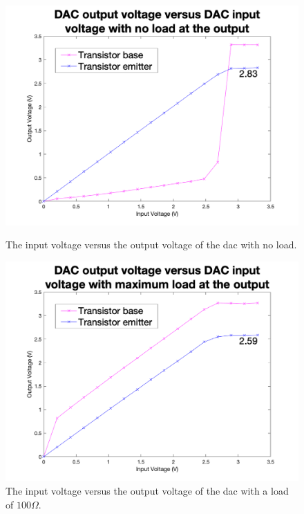 \begin{figure}[!ht]
    \centering
    \begin{minipage}{.5\textwidth}
        \centering
        \includegraphics[width=\textwidth]{Figures/Testing/DAC_no_load}
        \caption{The input voltage versus the output voltage of the \gls{dac} with no load.}
        \label{fig:dac-voltage-range-no-load} %
    \end{minipage}%
    \begin{minipage}{.5\textwidth}
        \centering
        \includegraphics[width=\textwidth]{Figures/Testing/DAC_loaded}
        \caption{The input voltage versus the output voltage of the \gls{dac} with a load of $100\Omega$.}
        \label{fig:dac-voltage-range-loaded} %
    \end{minipage}
\end{figure}

